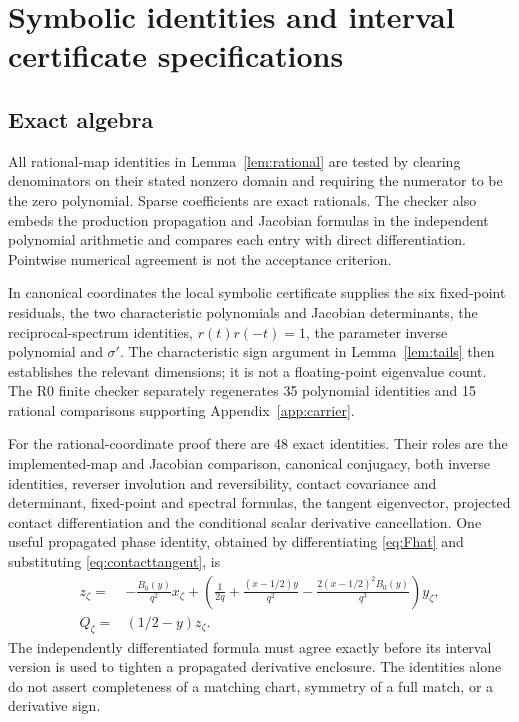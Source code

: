 \section{Symbolic identities and interval certificate specifications}
\label{app:symbolic}
\subsection{Exact algebra}
All rational-map identities in Lemma~\ref{lem:rational} are tested by
clearing denominators on their stated nonzero domain and requiring the
numerator to be the zero polynomial. Sparse coefficients are exact
rationals. The checker also embeds the production propagation and
Jacobian formulas in the independent polynomial arithmetic and compares
each entry with direct differentiation. Pointwise numerical agreement
is not the acceptance criterion.

In canonical coordinates the local symbolic certificate supplies the six
fixed-point residuals, the two characteristic polynomials and Jacobian
determinants, the reciprocal-spectrum identities, \(r(t)r(-t)=1\),
the parameter inverse polynomial and \(\sigma'\).
The characteristic sign argument in Lemma~\ref{lem:tails} then establishes
the relevant dimensions; it is not a floating-point eigenvalue count.
The R0 finite checker separately regenerates 35 polynomial identities
and 15 rational comparisons supporting Appendix~\ref{app:carrier}.

For the rational-coordinate proof there are 48 exact identities.
Their roles are the implemented-map and Jacobian comparison, canonical
conjugacy, both inverse identities, reverser involution and reversibility,
contact covariance and determinant, fixed-point and spectral formulas,
the tangent eigenvector, projected contact differentiation and the
conditional scalar derivative cancellation.
One useful propagated phase identity, obtained by differentiating
\eqref{eq:Fhat} and substituting \eqref{eq:contacttangent}, is
\begin{align*}
 z_\zeta={}&-\frac{B_0(y)}{q^2}x_\zeta+
 \left(\frac1{2q}+\frac{(x-1/2)y}{q^2}
       -\frac{2(x-1/2)^2B_0(y)}{q^3}\right)y_\zeta,\\
 Q_\zeta={}&(1/2-y)z_\zeta.
\end{align*}
The independently differentiated formula must agree exactly before its
interval version is used to tighten a propagated derivative enclosure.
The identities alone do not assert completeness of a matching chart,
symmetry of a full match, or a derivative sign.

